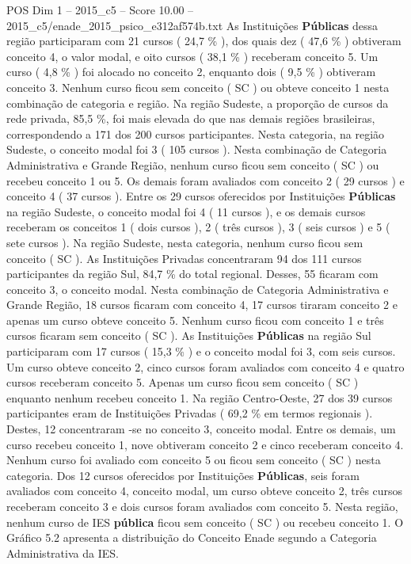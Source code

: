 \begin{textsample}{POS Dim 1 – 2015\_c5 – Score 10.00 – 2015\_c5/enade\_2015\_psico\_e312af574b.txt}
As Instituições \textbf{Públicas} dessa região participaram com 21 cursos ( 24,7 \% ), dos quais dez ( 47,6 \% ) obtiveram conceito 4, o valor modal, e oito cursos ( 38,1 \% ) receberam conceito 5.
Um curso ( 4,8 \% ) foi alocado no conceito 2, enquanto dois ( 9,5 \% ) obtiveram conceito 3.
Nenhum curso ficou sem conceito ( SC ) ou obteve conceito 1 nesta combinação de categoria e região.
Na região Sudeste, a proporção de cursos da rede privada, 85,5 \%, foi mais elevada do que nas demais regiões brasileiras, correspondendo a 171 dos 200 cursos participantes.
Nesta categoria, na região Sudeste, o conceito modal foi 3 ( 105 cursos ).
Nesta combinação de Categoria Administrativa e Grande Região, nenhum curso ficou sem conceito ( SC ) ou recebeu conceito 1 ou 5.
Os demais foram avaliados com conceito 2 ( 29 cursos ) e conceito 4 ( 37 cursos ).
Entre os 29 cursos oferecidos por Instituições \textbf{Públicas} na região Sudeste, o conceito modal foi 4 ( 11 cursos ), e os demais cursos receberam os conceitos 1 ( dois cursos ), 2 ( três cursos ), 3 ( seis cursos ) e 5 ( sete cursos ).
Na região Sudeste, nesta categoria, nenhum curso ficou sem conceito ( SC ).
As Instituições Privadas concentraram 94 dos 111 cursos participantes da região Sul, 84,7 \% do total regional.
Desses, 55 ficaram com conceito 3, o conceito modal.
Nesta combinação de Categoria Administrativa e Grande Região, 18 cursos ficaram com conceito 4, 17 cursos tiraram conceito 2 e apenas um curso obteve conceito 5.
Nenhum curso ficou com conceito 1 e três cursos ficaram sem conceito ( SC ).
As Instituições \textbf{Públicas} na região Sul participaram com 17 cursos ( 15,3 \% ) e o conceito modal foi 3, com seis cursos.
Um curso obteve conceito 2, cinco cursos foram avaliados com conceito 4 e quatro cursos receberam conceito 5.
Apenas um curso ficou sem conceito ( SC ) enquanto nenhum recebeu conceito 1.
Na região Centro-Oeste, 27 dos 39 cursos participantes eram de Instituições Privadas ( 69,2 \% em termos regionais ).
Destes, 12 concentraram -se no conceito 3, conceito modal.
Entre os demais, um curso recebeu conceito 1, nove obtiveram conceito 2 e cinco receberam conceito 4.
Nenhum curso foi avaliado com conceito 5 ou ficou sem conceito ( SC ) nesta categoria.
Dos 12 cursos oferecidos por Instituições \textbf{Públicas}, seis foram avaliados com conceito 4, conceito modal, um curso obteve conceito 2, três cursos receberam conceito 3 e dois cursos foram avaliados com conceito 5.
Nesta região, nenhum curso de IES \textbf{pública} ficou sem conceito ( SC ) ou recebeu conceito 1.
O Gráfico 5.2 apresenta a distribuição do Conceito Enade segundo a Categoria Administrativa da IES.

\end{textsample}
